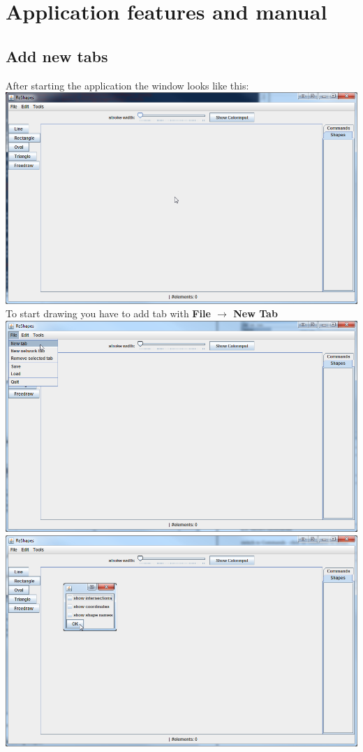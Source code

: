 \chapter{Application features and manual}

\section{Add new tabs}

After starting the application the window looks like this: \\
\includegraphics[width=1\textwidth]{img/startup_window} \\

To start drawing you have to add tab with \textbf{File $\rightarrow$ New Tab} \\
\includegraphics[width=1\textwidth]{img/add_new_tab_1} \\
\includegraphics[width=1\textwidth]{img/add_new_tab_2} 


